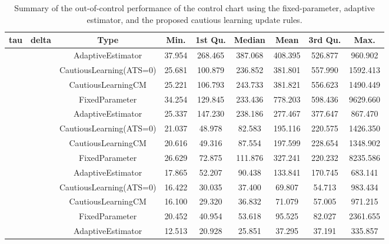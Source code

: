 \begin{table}[!h]

\caption{Summary of the out-of-control performance of the control chart using the fixed-parameter, adaptive estimator, and the proposed cautious learning update rules.}
\centering
\begin{tabular}[t]{ccccccccc}
\toprule
tau & delta & Type & Min. & 1st Qu. & Median & Mean & 3rd Qu. & Max.\\
\midrule
 &  & AdaptiveEstimator & 37.954 & 268.465 & 387.068 & 408.395 & 526.877 & 960.902\\

 &  & CautiousLearning(ATS=0) & 25.681 & 100.879 & 236.852 & 381.801 & 557.990 & 1592.413\\

 &  & CautiousLearningCM & 25.221 & 106.793 & 243.733 & 381.821 & 556.623 & 1490.449\\

 & \multirow[t]{-4}{*}{\centering\arraybackslash 0.25} & FixedParameter & 34.254 & 129.845 & 233.436 & 778.203 & 598.436 & 9629.660\\
\cmidrule{2-9}
 &  & AdaptiveEstimator & 25.337 & 147.230 & 238.186 & 277.467 & 377.647 & 867.470\\

 &  & CautiousLearning(ATS=0) & 21.037 & 48.978 & 82.583 & 195.116 & 220.575 & 1426.350\\

 &  & CautiousLearningCM & 20.616 & 49.316 & 87.554 & 197.599 & 228.654 & 1348.902\\

 & \multirow[t]{-4}{*}{\centering\arraybackslash 0.35} & FixedParameter & 26.629 & 72.875 & 111.876 & 327.241 & 220.232 & 8235.586\\
\cmidrule{2-9}
 &  & AdaptiveEstimator & 17.865 & 52.207 & 90.438 & 133.841 & 170.745 & 683.141\\

 &  & CautiousLearning(ATS=0) & 16.422 & 30.035 & 37.400 & 69.807 & 54.713 & 983.434\\

 &  & CautiousLearningCM & 16.100 & 29.320 & 36.832 & 71.079 & 57.005 & 971.215\\

 & \multirow[t]{-4}{*}{\centering\arraybackslash 0.50} & FixedParameter & 20.452 & 40.954 & 53.618 & 95.525 & 82.027 & 2361.655\\
\cmidrule{2-9}
 &  & AdaptiveEstimator & 12.513 & 20.928 & 25.851 & 37.295 & 37.191 & 335.857\\


\end{tabular}
\end{table}
